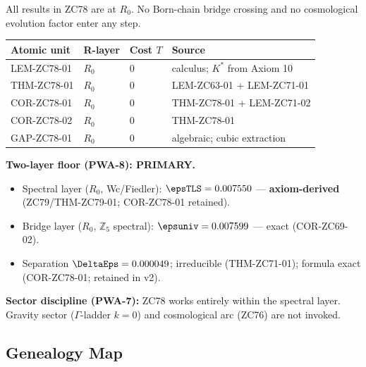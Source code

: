 \documentclass[12pt, a4paper]{article}
\begin{document}
\begin{layerbox}[title={R-Layer Assignments for ZC78}]

All results in ZC78 are at $R_0$. No Born-chain bridge crossing
and no cosmological evolution factor enter any step.

{\small\renewcommand{\arraystretch}{1.25}
\begin{center}
\begin{tabular}{@{}llll@{}}
\toprule
Atomic unit & R-layer & Cost $T$ & Source \\
\midrule
LEM-ZC78-01  & $R_0$ & $0$ & calculus; $K^*$ from Axiom 10 \\
THM-ZC78-01  & $R_0$ & $0$ & LEM-ZC63-01 + LEM-ZC71-01 \\
COR-ZC78-01  & $R_0$ & $0$ & THM-ZC78-01 + LEM-ZC71-02 \\
COR-ZC78-02  & $R_0$ & $0$ & THM-ZC78-01 \\
GAP-ZC78-01  & $R_0$ & $0$ & algebraic; cubic extraction \\
\bottomrule
\end{tabular}
\end{center}}

\textbf{Two-layer floor (PWA-8): PRIMARY.}
\begin{itemize}[leftmargin=2em, noitemsep]
  \item Spectral layer ($R_0$, Wc/Fiedler): $\epsTLS = 0.007550$
    --- \textbf{axiom-derived} (ZC79/THM-ZC79-01; COR-ZC78-01 retained).
  \item Bridge layer ($R_0$, $\mathbb{Z}_5$ spectral):
    $\epsuniv = 0.007599$ --- exact (COR-ZC69-02).
  \item Separation $\DeltaEps = 0.000049$; irreducible (THM-ZC71-01);
    formula exact (COR-ZC78-01; retained in v2).
\end{itemize}

\textbf{Sector discipline (PWA-7):} ZC78 works entirely within the
spectral layer. Gravity sector ($\Gamma$-ladder $k=0$) and
cosmological arc (ZC76) are not invoked.
\end{layerbox}

\subsection{Genealogy Map}
\label{sec:genealogy}
\end{document}

